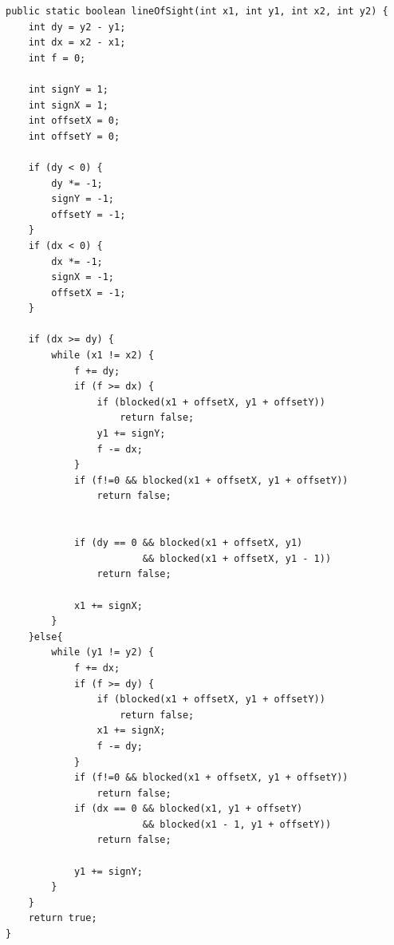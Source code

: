 \documentclass[11pt]{book}
\begin{document}
\lstset{style=customjava, caption=Funzione Line Of Sight}
\begin{lstlisting}
public static boolean lineOfSight(int x1, int y1, int x2, int y2) {
    int dy = y2 - y1;
    int dx = x2 - x1;
    int f = 0;

    int signY = 1;
    int signX = 1;
    int offsetX = 0;
    int offsetY = 0;

    if (dy < 0) {
        dy *= -1;
        signY = -1;
        offsetY = -1;
    }
    if (dx < 0) {
        dx *= -1;
        signX = -1;
        offsetX = -1;
    }

    if (dx >= dy) {
        while (x1 != x2) {
            f += dy;
            if (f >= dx) {
                if (blocked(x1 + offsetX, y1 + offsetY))
                    return false;
                y1 += signY;
                f -= dx;
            }
            if (f!=0 && blocked(x1 + offsetX, y1 + offsetY))
                return false;
            
            
            if (dy == 0 && blocked(x1 + offsetX, y1) 
                        && blocked(x1 + offsetX, y1 - 1))
                return false;

            x1 += signX;
        }
    }else{
        while (y1 != y2) {
            f += dx;
            if (f >= dy) {
                if (blocked(x1 + offsetX, y1 + offsetY))
                    return false;
                x1 += signX;
                f -= dy;
            }
            if (f!=0 && blocked(x1 + offsetX, y1 + offsetY))
                return false;
            if (dx == 0 && blocked(x1, y1 + offsetY) 
                        && blocked(x1 - 1, y1 + offsetY))
                return false;

            y1 += signY;
        }
    }
    return true;
}
\end{lstlisting}
\fi
\end{document}
